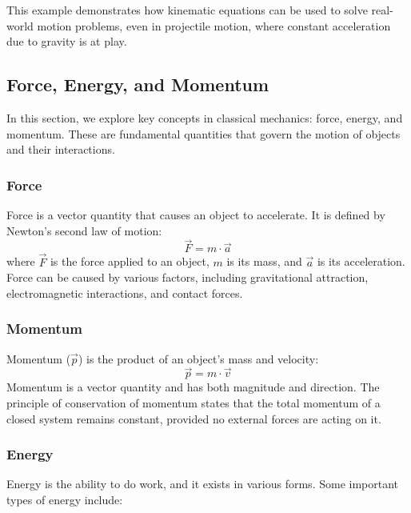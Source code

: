 \documentclass{article}
\begin{document}
This example demonstrates how kinematic equations can be used to solve real-world motion problems, even in projectile motion, where constant acceleration due to gravity is at play.

\subsection{Force, Energy, and Momentum}

In this section, we explore key concepts in classical mechanics: force, energy, and momentum. These are fundamental quantities that govern the motion of objects and their interactions.

\subsubsection*{Force}

Force is a vector quantity that causes an object to accelerate. It is defined by Newton's second law of motion:
\[
\vec{F} = m \cdot \vec{a}
\]
where \( \vec{F} \) is the force applied to an object, \( m \) is its mass, and \( \vec{a} \) is its acceleration. Force can be caused by various factors, including gravitational attraction, electromagnetic interactions, and contact forces.

\subsubsection*{Momentum}

Momentum (\( \vec{p} \)) is the product of an object's mass and velocity:
\[
\vec{p} = m \cdot \vec{v}
\]
Momentum is a vector quantity and has both magnitude and direction. The principle of conservation of momentum states that the total momentum of a closed system remains constant, provided no external forces are acting on it.

\subsubsection*{Energy}

Energy is the ability to do work, and it exists in various forms. Some important types of energy include:
\end{document}
